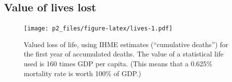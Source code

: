 \documentclass[
]{article}
\begin{document}
\newpage

\hypertarget{value-of-lives-lost}{%
\subsection{Value of lives lost}\label{value-of-lives-lost}}

\begin{figure}
\centering
\texttt{[image: p2\_files/figure-latex/lives-1.pdf]}
\caption{\label{fig:lives}Valued loss of life, using IHME estimates (``cumulative deaths'') for the first year of accumulated deaths. The value of a statistical life used is 160 times GDP per capita. (This means that a 0.625\% mortality rate is worth 100\% of GDP.)}
\end{figure}
\end{document}
